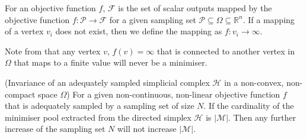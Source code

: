 \begin{definition} \label{def:hnew}
For an objective function $f$, $\mathcal{F}$ is the set of scalar outputs mapped by the objective function $f:\mathcal{P} \rightarrow \mathcal{F}$ for a given sampling set $\mathcal{P} \subseteq \Omega \subseteq \mathbb{R}^n$. If a mapping of a vertex $v_i$ does not exist, then we define the mapping as $f: v_i \rightarrow \infty$.
\end{definition}

Note from  that any vertex $v$, $f(v) = \infty$ that is connected to another vertex in $\Omega$ that maps to a finite value will never be a minimiser.

\begin{theorem} \label{theorem:invariance_n} (Invariance of an adequately sampled simplicial complex $\mathcal{H}$ in a non-convex, non-compact space $\Omega$) For a given non-continuous, non-linear objective function $f$ that is adequately sampled by a sampling set of size $N$. If the cardinality of the minimiser pool extracted from the directed simplex $\mathcal{H}$ is $|\mathcal{M}|$. Then any further increase of the sampling set $N$ will not increase $|\mathcal{M}|$.
\end{theorem}

